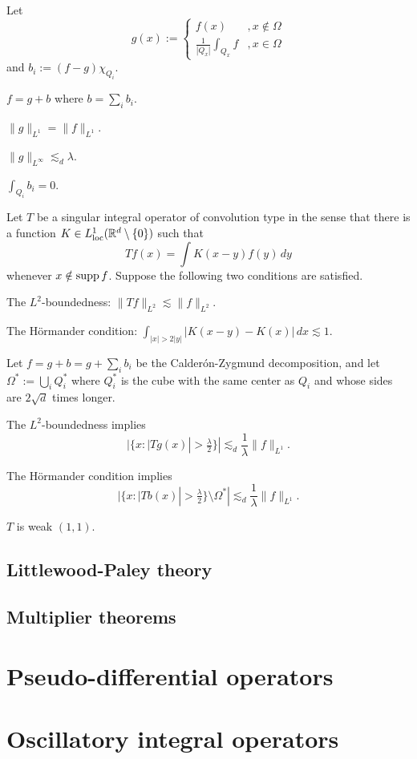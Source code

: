 \documentclass{../note}
\begin{document}
\begin{prb}
Let
\[g(x):=\begin{cases}f(x)&,x\notin\Omega\\\frac1{|Q_x|}\int_{Q_x}f&,x\in\Omega\end{cases}\]
and $b_i:=(f-g)\chi_{Q_i}$.
\begin{parts}
\item $f=g+b$ where $b=\sum_ib_i$.
\item $\|g\|_{L^1}=\|f\|_{L^1}$.
\item $\|g\|_{L^\infty}\lesssim_d\lambda$.
\item $\int_{Q_i}b_i=0$.
\end{parts}
\end{prb}


\begin{prb}
Let $T$ be a singular integral operator of convolution type in the sense that there is a function $K\in L_{\mathrm{loc}}^1(\mathbb{R}^d\setminus\{0\})$ such that
\[Tf(x)=\int K(x-y)f(y)\,dy\]
whenever $x\notin\operatorname{supp} f$.
Suppose the following two conditions are satisfied.
\begin{parts}[(i)]
\item
The $L^2$-boundedness: $\|Tf\|_{L^2}\lesssim\|f\|_{L^2}$.
\item
The H\"ormander condition: $\int_{|x|>2|y|}|K(x-y)-K(x)|\,dx\lesssim1$.
\end{parts}
Let $f=g+b=g+\sum_ib_i$ be the Calder\'on-Zygmund decomposition, and let $\Omega^*:=\bigcup_iQ_i^*$ where $Q_i^*$ is the cube with the same center as $Q_i$ and whose sides are $2\sqrt d$ times longer. 
\begin{parts}
\item
The $L^2$-boundedness implies
\[|\{x:|Tg(x)|>\tfrac\lambda2\}|\lesssim_d\frac1\lambda\|f\|_{L^1}.\]
\item
The H\"ormander condition implies
\[|\{x:|Tb(x)|>\tfrac\lambda2\}\setminus\Omega^*|\lesssim_d\frac1\lambda\|f\|_{L^1}.\]
\item
$T$ is weak $(1,1)$.
\end{parts}
\end{prb}



\chapter{Littlewood-Paley theory}
\chapter{Multiplier theorems}

\part{Pseudo-differential operators}


\part{Oscillatory integral operators}
\end{document}
